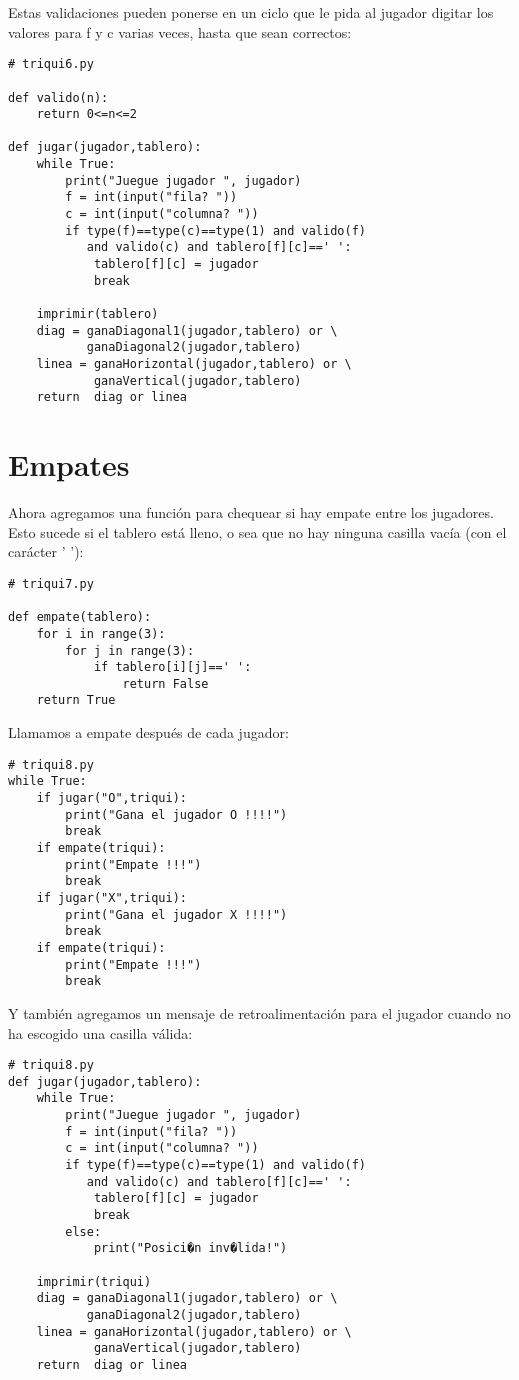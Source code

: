 Estas validaciones pueden ponerse en un ciclo que le pida al jugador
digitar los valores para f y c varias veces, hasta que sean correctos:

\begin{lstlisting}
# triqui6.py

def valido(n):
    return 0<=n<=2
    
def jugar(jugador,tablero):
    while True:     
        print("Juegue jugador ", jugador)
        f = int(input("fila? "))
        c = int(input("columna? "))
        if type(f)==type(c)==type(1) and valido(f) 
           and valido(c) and tablero[f][c]==' ':
            tablero[f][c] = jugador
            break      

    imprimir(tablero)
    diag = ganaDiagonal1(jugador,tablero) or \
           ganaDiagonal2(jugador,tablero)
    linea = ganaHorizontal(jugador,tablero) or \
            ganaVertical(jugador,tablero)
    return  diag or linea
\end{lstlisting}

\section{Empates}

Ahora agregamos una función para chequear si hay empate entre los
jugadores. Esto sucede si el tablero está lleno, o sea que no hay
ninguna casilla vacía (con el carácter ' '):

\begin{lstlisting}
# triqui7.py

def empate(tablero):
    for i in range(3):
        for j in range(3):
            if tablero[i][j]==' ':
                return False
    return True
\end{lstlisting}

Llamamos a empate después de cada jugador: 

\begin{lstlisting}
# triqui8.py
while True:
    if jugar("O",triqui):
        print("Gana el jugador O !!!!")
        break
    if empate(triqui):
        print("Empate !!!")
        break
    if jugar("X",triqui):
        print("Gana el jugador X !!!!")
        break
    if empate(triqui):
        print("Empate !!!")
        break
\end{lstlisting}

Y también agregamos un mensaje de retroalimentación para el jugador
cuando no ha escogido una casilla válida:

\begin{lstlisting}
# triqui8.py
def jugar(jugador,tablero):
    while True:     
        print("Juegue jugador ", jugador)
        f = int(input("fila? "))
        c = int(input("columna? "))
        if type(f)==type(c)==type(1) and valido(f) 
           and valido(c) and tablero[f][c]==' ':
            tablero[f][c] = jugador
            break
        else:
            print("Posici�n inv�lida!")

    imprimir(triqui)
    diag = ganaDiagonal1(jugador,tablero) or \
           ganaDiagonal2(jugador,tablero)
    linea = ganaHorizontal(jugador,tablero) or \
            ganaVertical(jugador,tablero)
    return  diag or linea
\end{lstlisting}

